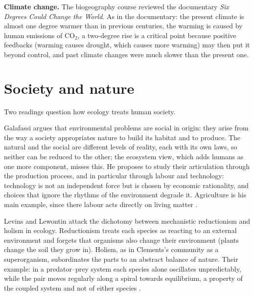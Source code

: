 \textbf{Climate change.}
The biogeography course reviewed
the documentary \emph{Six Degrees Could
Change the World}. As in the documentary:
the present climate is almost one degree
warmer than in previous centuries, the
warming is caused by human emissions of
$\mathrm{CO_2}$, a two-degree rise is a
critical point because positive feedbacks
(warming causes drought, which causes more
warming) may then put it beyond control, and
past climate changes were much slower than
the present one.

\section{Society and nature}
\label{section-society-nature}

Two readings question how ecology treats
human society.

Galafassi argues that environmental
problems are social in origin: they arise
from the way a society appropriates nature
to build its habitat and to produce. The
natural and the social are different levels
of reality, each with its own laws, so
neither can be reduced to the other; the
ecosystem view, which adds humans as one
more component, misses this. He proposes to
study their articulation through the
production process, and in particular
through labour and technology: technology
is not an independent force but is chosen
by economic rationality, and choices that
ignore the rhythms of the environment
degrade it. Agriculture is his main
example, since there labour acts directly on
living matter \cite{galafassi2000sociedad}.

Levins and Lewontin attack the dichotomy
between mechanistic reductionism and
holism in ecology. Reductionism treats each
species as reacting to an external
environment and forgets that organisms also
change their environment (plants change the
soil they grow in). Holism, as in Clements's
community as a superorganism, subordinates
the parts to an abstract balance of nature.
Their example: in a predator--prey system
each species alone oscillates
unpredictably, while the pair moves
regularly along a spiral towards
equilibrium, a property of the coupled
system and not of either species
\cite[Chapter 6]{levins1985dialectical}.





